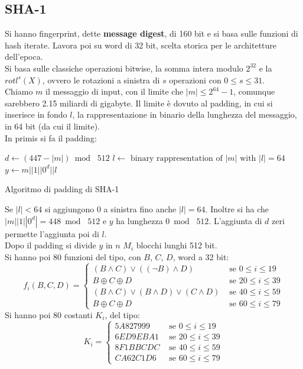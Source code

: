 \documentclass[a4paper,12pt, oneside]{book}
\begin{document}
\subsection{SHA-1}
Si hanno fingerprint, dette \textbf{message digest}, di 160 bit e si basa sulle
funzioni di hash iterate. Lavora poi su word di 32 bit, scelta storica per le
architetture dell'epoca.\\
Si basa sulle classiche operazioni bitwise, la somma intera modulo $2^{32}$ e la
$rotl^s(X)$, ovvero le rotazioni a sinistra di $s$ operazioni con $0\leq s \leq
31$.\\
Chiamo $m$ il messaggio di input, con il limite che $|m|\leq 2^{64}-1$, comunque
sarebbero 2.15 miliardi di gigabyte. Il limite è dovuto al padding, in cui si
inserisce in fondo $l$, la rappresentazione in binario della lunghezza del
messaggio, in 64 bit (da cui il limite).\\
In primis si fa il padding:
\begin{algorithm}[H]
  \begin{algorithmic}
    \State $d\gets (447-|m|)\bmod\,\,512$
    \State $l\gets\mbox{ binary rappresentation of }|m|\mbox{ with }|l|=64$
    \State $y\gets m||1||0^d||l$
    \EndFunction
  \end{algorithmic}
  \caption{Algoritmo di padding di SHA-1}
\end{algorithm}
Se $|l|<64$ si aggiungono 0 a sinistra fino anche $|l|=64$.
Inoltre si ha che
$|m||1||0^d|=448\bmod\,\,512$ e $y$ ha lunghezza $0\bmod\,\,512$. L'aggiunta di
$d$ zeri permette l'aggiunta poi di $l$.\\
Dopo il padding si divide $y$ in $n$ $M_i$ blocchi lunghi 512 bit.\\
Si hanno poi 80 funzioni del tipo, con $B$, $C$, $D$, word a 32 bit:
\[f_i(B,C,D)=
  \begin{cases}
    (B\land C)\lor ((\neg B)\land D)&\mbox{ se } 0\leq i\leq 19\\
    B\oplus C\oplus D&\mbox{ se } 20\leq i\leq 39\\
    (B\land C)\lor (B\land D)\lor (C\land D)&\mbox{ se } 40\leq i\leq 59\\
    B\oplus C\oplus D&\mbox{ se } 60\leq i\leq 79
  \end{cases}
\]
Si hanno poi 80 costanti $K_i$, del tipo:
\[K_i=
  \begin{cases}
    5A827999&\mbox{ se } 0\leq i\leq 19\\
    6ED9EBA1&\mbox{ se } 20\leq i\leq 39\\
    8F1BBCDC&\mbox{ se } 40\leq i\leq 59\\
    CA62C1D6&\mbox{ se } 60\leq i\leq 79
  \end{cases}
\]
\end{document}
